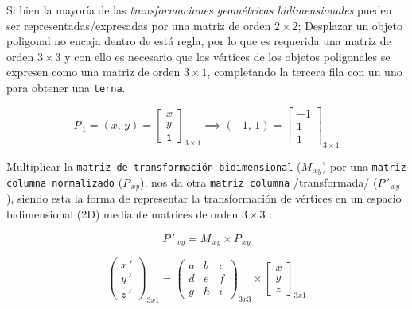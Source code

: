 \documentclass[10pt, twocolumn, landscape, a4paper]{article}
\begin{document}
\noindent Si bien la mayoría de las \emph{transformaciones geométricas bidimensionales} pueden ser representadas/expresadas por una matriz de orden $2{\times}2$; Desplazar un objeto poligonal no encaja dentro de está regla, por lo que es requerida una matriz de orden $3{\times}3$ y con ello es necesario que los vértices de los objetos poligonales se expresen como una matriz de orden $3{\times}1$, completando la tercera fila con un uno para obtener una {\tt terna}. 

$$P_{\,1} = (x,\,y) = \begin{bmatrix}x \\ y \\ \mathtt{1}\end{bmatrix}_{3 \times 1} \implies (-1,\,1) = \begin{bmatrix} -1 \\ 1 \\ 1\end{bmatrix}_{3 \times 1}$$

\noindent Multiplicar la {\tt matriz de transformación bidimensional} ($M_{\,xy}$) por una {\tt matriz columna normalizado} ($P_{\,xy}$), nos da otra {\tt matriz columna} /transformada/ ($P\,'_{\,xy}$), siendo esta la forma de representar la transformación de vértices en un espacio bidimensional (2D) mediante matrices de orden $3{\times}3$ :

$$
P\,'_{\,xy} = M_{\,xy} \times P_{\,xy} 
$$

$$
\begin{pmatrix} x\,' \\ y\,' \\ z\,' \end{pmatrix}_{3x1} = \begin{pmatrix} a & b & c \\ d & e & f \\ g & h & i \end{pmatrix}_{3x3} \times \begin{bmatrix} x \\ y \\ z \end{bmatrix}_{3x1} 
$$
\end{document}
